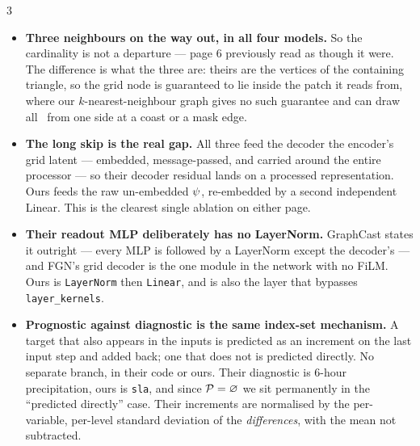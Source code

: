 \documentclass[11pt,landscape]{article}
\begin{document}
\begin{multicols}{3}
\begin{itemize}[leftmargin=1.1em]\setlength{\itemsep}{0.45em}

  \item \textbf{Three neighbours on the way out, in all four models.}  So the
    cardinality is not a departure --- page 6 previously read as though it were.
    The difference is what the three are: theirs are the vertices of the
    containing triangle, so the grid node is guaranteed to lie inside the patch
    it reads from, where our $k$-nearest-neighbour graph gives no such guarantee
    and can draw all \valdecdegmax\ from one side at a coast or a mask edge.

  \item \textbf{The long skip is the real gap.}  All three feed the decoder the
    encoder's grid latent --- embedded, message-passed, and carried around the
    entire processor --- so their decoder residual lands on a processed
    representation.  Ours feeds the raw un-embedded $\psi$, re-embedded by a
    second independent Linear.  This is the clearest single ablation on either
    page.

  \item \textbf{Their readout MLP deliberately has no LayerNorm.}  GraphCast
    states it outright --- every MLP is followed by a LayerNorm except the
    decoder's --- and FGN's grid decoder is the one module in the network with no
    FiLM.  Ours is {\tt LayerNorm} then {\tt Linear}, and is also the layer that
    bypasses {\tt layer\_kernels}.

  \item \textbf{Prognostic against diagnostic is the same index-set mechanism.}
    A target that also appears in the inputs is predicted as an increment on the
    last input step and added back; one that does not is predicted directly.  No
    separate branch, in their code or ours.  Their diagnostic is 6-hour
    precipitation, ours is {\tt sla}, and since $\mathcal{P} = \varnothing$ we sit
    permanently in the ``predicted directly'' case.  Their increments are
    normalised by the per-variable, per-level standard deviation of the
    \emph{differences}, with the mean not subtracted.

\end{itemize}

\end{multicols}
\end{document}
